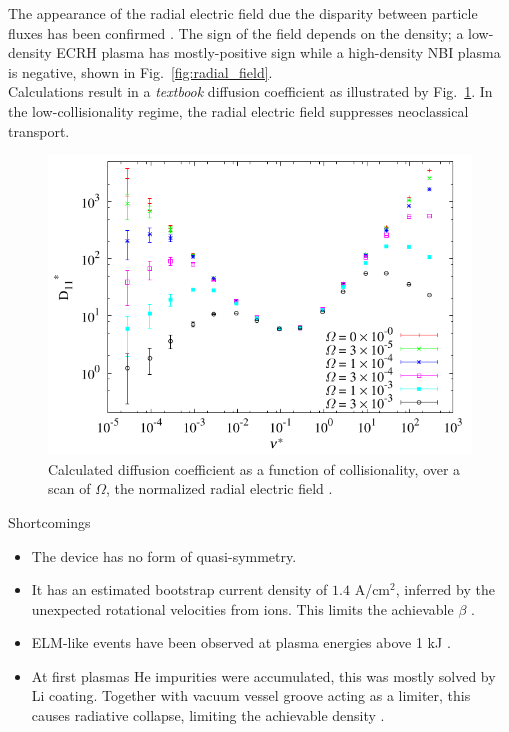 \documentclass{beamer}
\newlength{\onecolwid}
\begin{document}
\begin{frame}[t]
\begin{columns}[t]
\begin{column}{\onecolwid}
\textrm{\hspace{32pt} The appearance of the radial electric field due the disparity between particle fluxes has been confirmed \cite{velasco_study_2012}. The sign of the field depends on the density; a low-density ECRH plasma has mostly-positive sign while a high-density NBI plasma is negative, shown in Fig.~\ref{fig:radial_field}. \\ \hspace{32pt} Calculations result in a \emph{textbook} diffusion coefficient as illustrated by Fig.~\ref{fig:diffusion}. In the low-collisionality regime, the radial electric field suppresses neoclassical transport.}

\begin{figure}
	\includegraphics[trim={0 0.4cm 0 0.2cm},clip, width=0.7\linewidth]{../Graphics/Diffusion.png}
	\caption{Calculated diffusion coefficient as a function of collisionality, over a scan of $\Omega$, the normalized radial electric field \cite{velasco_study_2012}.}
	\label{fig:diffusion}
\end{figure}

\begin{block}{Shortcomings}
\begin{itemize}
	\item The device has no form of quasi-symmetry.
	\item It has an estimated bootstrap current density of $1.4$ A/cm$^2$, inferred by the unexpected rotational velocities from ions. This limits the achievable $\beta$ \cite{rapisarda_investigation_2005}.
	\item ELM-like events have been observed at plasma energies above 1 kJ \cite{ascasibar_overview_2001}.
	\item At first plasmas He impurities were accumulated, this was mostly solved by Li coating. Together with vacuum vessel groove acting as a limiter, this causes radiative collapse, limiting the achievable density \cite{sanchez_confinement_2009}.
\end{itemize}
\end{block}


\end{column}
\end{columns}
\end{frame}
\end{document}

